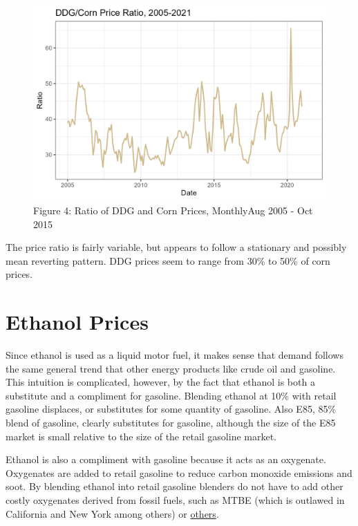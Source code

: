 \documentclass[
  letterpaper,
  DIV=11,
  numbers=noendperiod]{scrreprt}
\begin{document}
\begin{figure}

{\centering \includegraphics{assets/DDGCORNRatio.png}

}

\caption{Figure 4: Ratio of DDG and Corn Prices, MonthlyAug 2005 - Oct
2015}

\end{figure}

The price ratio is fairly variable, but appears to follow a stationary
and possibly mean reverting pattern. DDG prices seem to range from 30\%
to 50\% of corn prices.

\hypertarget{ethanol-prices}{%
\section{Ethanol Prices}\label{ethanol-prices}}

Since ethanol is used as a liquid motor fuel, it makes sense that demand
follows the same general trend that other energy products like crude oil
and gasoline. This intuition is complicated, however, by the fact that
ethanol is both a substitute and a compliment for gasoline. Blending
ethanol at 10\% with retail gasoline displaces, or substitutes for some
quantity of gasoline. Also E85, 85\% blend of gasoline, clearly
substitutes for gasoline, although the size of the E85 market is small
relative to the size of the retail gasoline market.

Ethanol is also a compliment with gasoline because it acts as an
oxygenate. Oxygenates are added to retail gasoline to reduce carbon
monoxide emissions and soot. By blending ethanol into retail gasoline
blenders do not have to add other costly oxygenates derived from fossil
fuels, such as MTBE (which is outlawed in California and New York among
others) or \href{https://en.wikipedia.org/wiki/Oxygenate}{others}.
\end{document}
